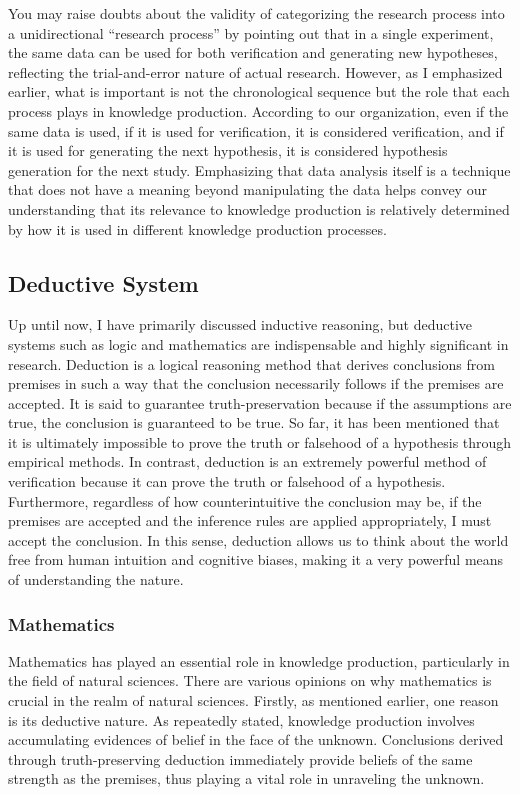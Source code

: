 \documentclass{article}
\begin{document}
You may raise doubts about the validity of categorizing the research process into a unidirectional ``research process'' by pointing out that in a single experiment, the same data can be used for both verification and generating new hypotheses, reflecting the trial-and-error nature of actual research. However, as I emphasized earlier, what is important is not the chronological sequence but the role that each process plays in knowledge production. According to our organization, even if the same data is used, if it is used for verification, it is considered verification, and if it is used for generating the next hypothesis, it is considered hypothesis generation for the next study. Emphasizing that data analysis itself is a technique that does not have a meaning beyond manipulating the data helps convey our understanding that its relevance to knowledge production is relatively determined by how it is used in different knowledge production processes.

\subsection{Deductive System}
Up until now, I have primarily discussed inductive reasoning, but deductive systems such as logic and mathematics are indispensable and highly significant in research. Deduction is a logical reasoning method that derives conclusions from premises in such a way that the conclusion necessarily follows if the premises are accepted. It is said to guarantee truth-preservation because if the assumptions are true, the conclusion is guaranteed to be true. So far, it has been mentioned that it is ultimately impossible to prove the truth or falsehood of a hypothesis through empirical methods. In contrast, deduction is an extremely powerful method of verification because it can prove the truth or falsehood of a hypothesis. Furthermore, regardless of how counterintuitive the conclusion may be, if the premises are accepted and the inference rules are applied appropriately, I must accept the conclusion. In this sense, deduction allows us to think about the world free from human intuition and cognitive biases, making it a very powerful means of understanding the nature.

\subsubsection{Mathematics}
Mathematics has played an essential role in knowledge production, particularly in the field of natural sciences. There are various opinions on why mathematics is crucial in the realm of natural sciences. Firstly, as mentioned earlier, one reason is its deductive nature. As repeatedly stated, knowledge production involves accumulating evidences of belief in the face of the unknown. Conclusions derived through truth-preserving deduction immediately provide beliefs of the same strength as the premises, thus playing a vital role in unraveling the unknown. 
\end{document}
